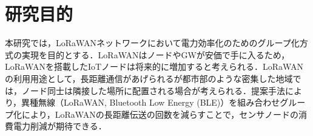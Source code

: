 \section{研究目的}
本研究では，LoRaWANネットワークにおいて電力効率化のためのグループ化方式の実現を目的とする．LoRaWANはノードやGWが安価で手に入るため，LoRaWANを搭載したIoTノードは将来的に増加すると考えられる．LoRaWANの利用用途として，長距離通信があげられるが都市部のような密集した地域では，ノード同士は隣接した場所に配置される場合が考えられる．提案手法により，異種無線（LoRaWAN, Bluetooth Low Energy (BLE)）を組み合わせグループ化により，LoRaWANの長距離伝送の回数を減らすことで，センサノードの消費電力削減が期待できる．